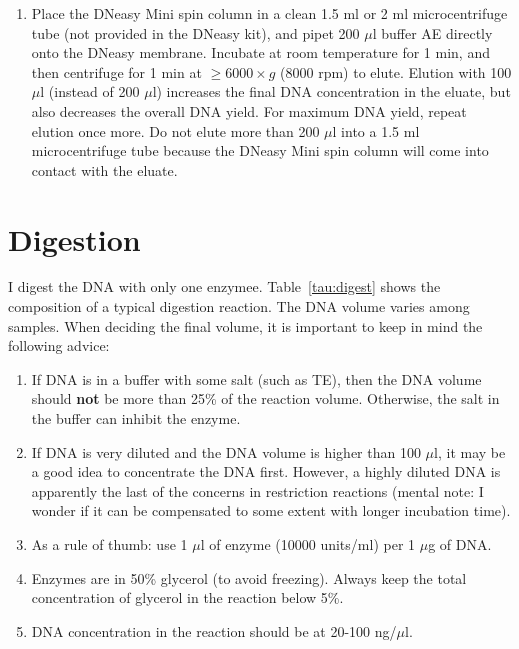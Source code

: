 \documentclass[a4paper,12pt]{article}
\begin{document}
\begin{enumerate}
\item Place the DNeasy Mini spin column in a clean 1.5 ml or 2 ml microcentrifuge tube (not provided in the DNeasy kit), and pipet 200 $\mu$l buffer AE directly onto the DNeasy membrane. Incubate at room temperature for 1 min, and then centrifuge for 1 min at $\geq6000 \times g$ (8000 rpm) to elute. Elution with 100 $\mu$l (instead of 200 $\mu$l) increases the final DNA concentration in the eluate, but also decreases the overall DNA yield. For maximum DNA yield, repeat elution once more. Do not elute more than 200 $\mu$l into a 1.5 ml microcentrifuge tube because the DNeasy Mini spin column will come into contact with the eluate.
\end{enumerate}

\section{Digestion}
I digest the DNA with only one enzymee. Table~\ref{tau:digest} shows the composition of a typical digestion reaction. The DNA volume varies among samples. When deciding the final volume, it is important to keep in mind the following advice:
\begin{enumerate}
   \item If DNA is in a buffer with some salt (such as TE), then the DNA volume should \textbf{not} be more than 25\% of the reaction volume. Otherwise, the salt in the buffer can inhibit the enzyme.
   \item If DNA is very diluted and the DNA volume is higher than 100 $\mu$l, it may be a good idea to concentrate the DNA first. However, a highly diluted DNA is apparently the last of the concerns in restriction reactions (mental note: I wonder if it can be compensated to some extent with longer incubation time).
   \item As a rule of thumb: use 1 $\mu$l of enzyme (10000 units/ml) per 1 $\mu$g of DNA.
   \item Enzymes are in 50\% glycerol (to avoid freezing). Always keep the total concentration of glycerol in the reaction below 5\%.
   \item DNA concentration in the reaction should be at 20-100 ng/$\mu$l.
\end{enumerate}
\end{document}
